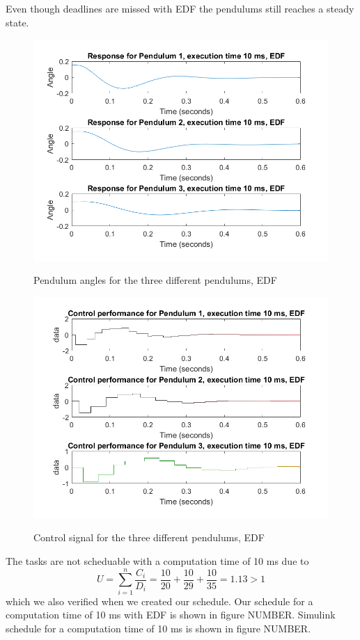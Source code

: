 \documentclass[12pt,a4paper]{article}
\begin{document}
\subsection{}
Even though deadlines are missed with EDF the pendulums still reaches a steady state. 
\begin{center}
	\begin{figure}
	\includegraphics[scale=0.5]{ex6531.png}
	\label{fig:ex61}
	\caption{Pendulum angles for the three different pendulums, EDF}
	\end{figure}
\end{center}
\begin{center}
	\begin{figure}
	\includegraphics[scale=0.5]{ex6532.png}
	\label{fig:ex62}
	\caption{Control signal  for the three different pendulums, EDF}
	\end{figure}
\end{center}
The tasks are not scheduable with a computation time of 10 ms due to 
\begin{equation}
U = \sum\limits_{i=1}^n \frac{C_i}{D_i} = \frac{10}{20}+\frac{10}{29}+\frac{10}{35} = 1.13 > 1
\end{equation}
which we also verified when we created our schedule. Our schedule for a computation time of 10 ms with EDF is shown in figure NUMBER. Simulink schedule for a computation time of 10 ms is shown in figure NUMBER.
\end{document}
